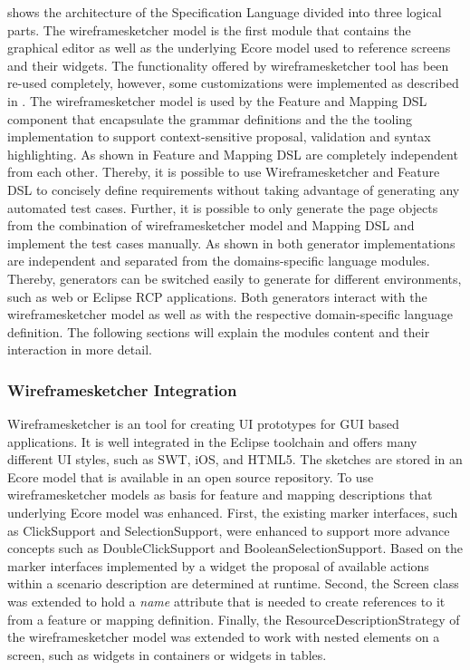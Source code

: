 \documentclass{sig-alternate-05-2015}
\begin{document}
 shows the architecture of the Specification Language divided into three logical parts. 
The wireframesketcher model is the first module that contains the graphical editor as well as the underlying Ecore model used to reference screens and their widgets.
The functionality offered by wireframesketcher tool has been re-used completely, however, some customizations were implemented as described in .
The wireframesketcher model is used by the Feature and Mapping DSL component that encapsulate the grammar definitions and the the tooling implementation to support context-sensitive proposal, validation and syntax highlighting.
As shown in  Feature and Mapping DSL are completely independent from each other.
Thereby, it is possible to use Wireframesketcher and Feature DSL to concisely define requirements without taking advantage of generating any automated test cases.
Further, it is possible to only generate the page objects from the combination of wireframesketcher model and Mapping DSL and implement the test cases manually.
As shown in  both generator implementations are independent and separated from the domains-specific language modules.
Thereby, generators can be switched easily to generate for different environments, such as web or Eclipse RCP applications.
Both generators interact with the wireframesketcher model as well as with the respective domain-specific language definition.
The following sections will explain the modules content and their interaction in more detail.

\subsubsection{Wireframesketcher Integration}\label{sec:WireframesketcherIntegration} 
Wireframesketcher is an tool for creating UI prototypes for GUI based applications. 
It is well integrated in the Eclipse toolchain and offers many different UI styles, such as SWT, iOS, and HTML5.
The sketches are stored in an Ecore model that is available in an open source repository.
To use wireframesketcher models as basis for feature and mapping descriptions that underlying Ecore model was enhanced.
First, the existing marker interfaces, such as ClickSupport and SelectionSupport, were enhanced to support more advance concepts such as DoubleClickSupport and BooleanSelectionSupport.
Based on the marker interfaces implemented by a widget the proposal of available actions within a scenario description are determined at runtime.
Second, the Screen class was extended to hold a \textit{name} attribute that is needed to create references to it from a feature or mapping definition.
Finally, the ResourceDescriptionStrategy of the wireframesketcher model was extended to work with nested elements on a screen, such as widgets in containers or widgets in tables.
\end{document}
